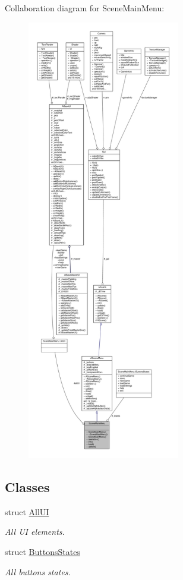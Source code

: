 Collaboration diagram for Scene\+Main\+Menu\+:
\nopagebreak
\begin{figure}[H]
\begin{center}
\leavevmode
\includegraphics[height=550pt]{class_scene_main_menu__coll__graph}
\end{center}
\end{figure}
\subsection*{Classes}
\begin{DoxyCompactItemize}
\item 
struct \hyperlink{struct_scene_main_menu_1_1_all_u_i}{All\+UI}
\begin{DoxyCompactList}\small\item\em All UI elements. \end{DoxyCompactList}\item 
struct \hyperlink{struct_scene_main_menu_1_1_buttons_states}{Buttons\+States}
\begin{DoxyCompactList}\small\item\em All buttons states. \end{DoxyCompactList}\end{DoxyCompactItemize}

